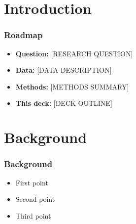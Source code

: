 \documentclass[xcolor = x11names, compress, aspectratio = 169]{beamer}
\renewcommand{\(}{\begin{columns}}
\renewcommand{\)}{\end{columns}}
\newcommand{\<}[1]{\begin{column}{#1}}
\renewcommand{\>}{\end{column}}
\begin{document}


\section{Introduction}

    \begin{frame}
    \frametitle{Roadmap}
        \begin{itemize}
            \item \textbf{Question:} [RESEARCH QUESTION]
            \vspace{0.2cm}
            \item \textbf{Data:} [DATA DESCRIPTION]
            \vspace{0.2cm}
            \item \textbf{Methods:} [METHODS SUMMARY]
            \vspace{0.2cm}
            \item \textbf{This deck:} [DECK OUTLINE]
        \end{itemize}
    \end{frame}

\section{Background}

    \begin{frame}
    \frametitle{Background}
        \begin{itemize}
            \item First point
            \vspace{0.3cm}
            \item Second point
            \vspace{0.3cm}
            \item Third point
        \end{itemize}
    \end{frame}
\end{document}
